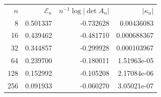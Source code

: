 \begin{tabular}{rrrr}\toprule
$n$ & $\mathcal E_n$ & $n^{-1}\log|\det A_n|$ & $|\kappa_n|$ \\
8 & 0.501337 & -0.732628 & 0.00436083 \\
16 & 0.439462 & -0.481710 & 0.000688367 \\
32 & 0.344857 & -0.299928 & 0.000103967 \\
64 & 0.239700 & -0.180011 & 1.51963e-05 \\
128 & 0.152992 & -0.105208 & 2.17084e-06 \\
256 & 0.091933 & -0.060270 & 3.05021e-07 \\
\bottomrule\end{tabular}
